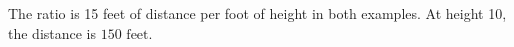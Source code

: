 The ratio is 15 feet of distance per foot of height in both examples. At height 10, the distance is $\boxed{150\text{ feet}}$.
